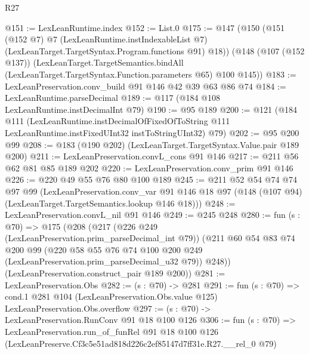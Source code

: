 \begin{lexlean}{R27}
\begin{coremodule}
@151 := LexLeanRuntime.index
@152 := List.{0}
@175 := @147
    (@150
      (@151
        (@152 @7)
        @7
        (LexLeanRuntime.instIndexableList @7)
        (LexLeanTarget.TargetSyntax.Program.functions @91)
        @18))
    (@148
      (@107 (@152 @137))
      (LexLeanTarget.TargetSemantics.bindAll
        (LexLeanTarget.TargetSyntax.Function.parameters @65)
        @100
        @145))
@183 := LexLeanPreservation.conv_build @91 @146 @42 @39 @63 @86 @74
@184 := LexLeanRuntime.parseDecimal
@189 := @117 (@184 @108 LexLeanRuntime.instDecimalInt @79)
@190 := @95 @189
@200 := @121
    (@184
      @111
      (LexLeanRuntime.instDecimalOfFixedOfToString
        @111
        LexLeanRuntime.instFixedUInt32
        instToStringUInt32)
      @79)
@202 := @95 @200 @99
@208 := @183 (@190 @202) (LexLeanTarget.TargetSyntax.Value.pair @189 @200)
@211 := LexLeanPreservation.convL_cons @91 @146
@217 := @211 @56 @62 @81 @85 @189 @202
@220 := LexLeanPreservation.conv_prim @91 @146
@226 := @220 @49 @55 @76 @80 @100 @189
@245 := @211
    @52
    @54
    @74
    @74
    @97
    @99
    (LexLeanPreservation.conv_var
      @91
      @146
      @18
      @97
      (@148 (@107 @94) (LexLeanTarget.TargetSemantics.lookup @146 @18)))
@248 := LexLeanPreservation.convL_nil @91 @146
@249 := @245 @248
@280 := fun (s : @70) =>
  @175
    (@208
      (@217
        (@226 @249 (LexLeanPreservation.prim_parseDecimal_int @79))
        (@211
          @60
          @54
          @83
          @74
          @200
          @99
          (@220 @58 @55 @76 @74 @100 @200 @249 (LexLeanPreservation.prim_parseDecimal_u32 @79))
          @248))
      (LexLeanPreservation.construct_pair @189 @200))
@281 := LexLeanPreservation.Obs
@282 := (s : @70) -> @281
@291 := fun (s : @70) =>
  cond.{1} @281 @104 (LexLeanPreservation.Obs.value @125) LexLeanPreservation.Obs.overflow
@297 := (s : @70) -> LexLeanPreservation.RunConv @91 @18 @100 @126
@306 := fun (s : @70) =>
  LexLeanPreservation.run_of_funRel
    @91
    @18
    @100
    @126
    (LexLeanPreserve.Cf3c5e51ad818d226c2ef85147d7ff31e.R27.__rel_0 @79)
\end{coremodule}
\end{lexlean}
